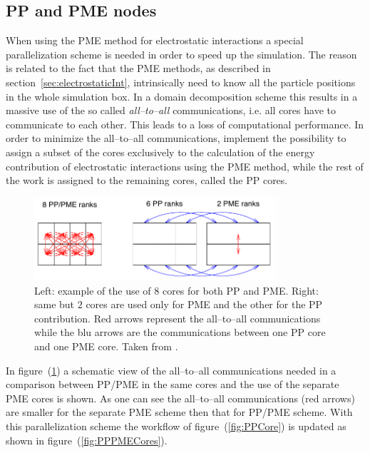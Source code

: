 \subsection{PP and PME nodes}
When using the \ac{PME} method for electrostatic interactions a special parallelization scheme is needed in order 
to speed up the simulation. The reason is related to the fact that the \ac{PME} methods, as described in 
section~\ref{sec:electrostaticInt}, intrinsically need to know all the particle positions in the whole simulation 
box. In a domain decomposition scheme this results in a massive use of the so called \textit{all--to--all} 
communications, i.e. all cores have to communicate to each other. This leads to a loss of computational 
performance. In order to minimize the all--to--all communications, \gromacs implement the possibility to assign a 
subset of the cores exclusively to the calculation of the energy contribution of electrostatic interactions using 
the \ac{PME} method, while the rest of the work is assigned to the remaining cores, called the \ac{PP} cores. 
\begin{figure}[h!t]
	\centering
	\includegraphics[width=0.8\textwidth]{./img/PMENodes}
	\caption{Left: example of the use of $8$ cores for both \acs{PP} and \acs{PME}. Right: same but $2$ cores are used only for \acs{PME} and the other for the \acs{PP} contribution. Red arrows represent the all--to--all communications while the blu arrows are the communications between one \acs{PP} core and one \acs{PME} core. Taken from \cite{gromacsManual}.}
	\label{fig:PMENodes}
\end{figure} 
In figure~(\ref{fig:PMENodes}) a schematic view of the all--to--all communications needed in a comparison between 
\ac{PP}/\ac{PME} in the same cores and the use of the separate \ac{PME} cores is shown. As one can see the 
all--to--all communications (red arrows) are smaller for the separate \acs{PME} scheme then that for 
\ac{PP}/\ac{PME} scheme. With this parallelization scheme the workflow of figure~(\ref{fig:PPCore}) is updated as 
shown in figure~(\ref{fig:PPPMECores}). 
